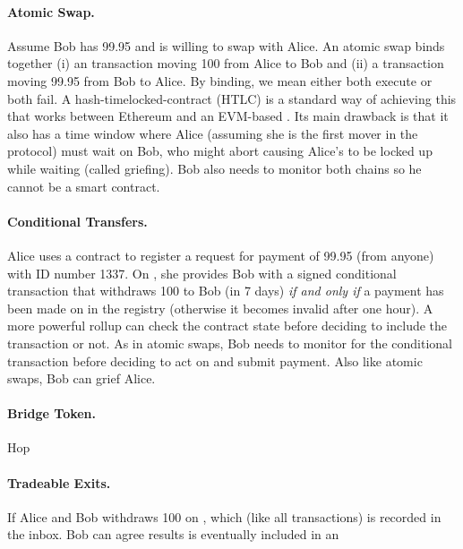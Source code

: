 \paragraph{Atomic Swap.} Assume Bob has 99.95 \ethone and is willing to swap with Alice. An atomic swap binds together (i) an \layertwo transaction moving 100 \ethtwo from Alice to Bob and (ii) a \layerone transaction moving 99.95 \ethone from Bob to Alice. By binding, we mean either both execute or both fail. A hash-timelocked-contract (HTLC) is a standard way of achieving this that works between Ethereum and an EVM-based \layertwo. Its main drawback is that it also has a time window where Alice (assuming she is the first mover in the protocol) must wait on Bob, who might abort causing Alice's \ethtwo to be locked up while waiting (called griefing). Bob also needs to monitor both chains so he cannot be a smart contract. 

\paragraph{Conditional Transfers.} Alice uses a \layerone contract to register a request for payment of 99.95 \ethone (from anyone) with ID number 1337. On \layertwo,  she provides Bob with a signed conditional transaction that withdraws 100 \ethtwo to Bob (in 7 days) \textit{if and only if} a payment has been made on \layerone in the registry (otherwise it becomes invalid after one hour). A more powerful rollup can check the \layerone contract state before deciding to include the \layertwo transaction or not. As in atomic swaps, Bob needs to monitor \layertwo for the conditional transaction before deciding to act on \layerone and submit payment. Also like atomic swaps, Bob can grief Alice.



\paragraph{Bridge Token.} Hop

\paragraph{Tradeable Exits.} If Alice and Bob withdraws 100 \ethtwo on \layertwo, which (like all \layertwo transactions) is recorded in the \layerone inbox. Bob can agree  results is eventually included in an \rblock 


